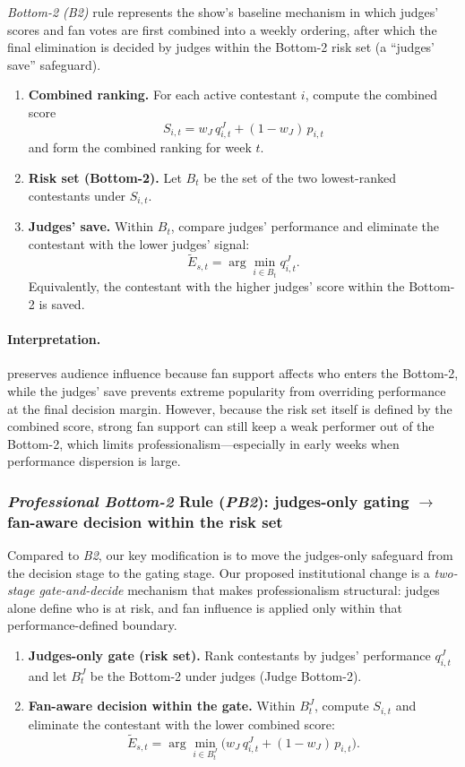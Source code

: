 \textit{Bottom-2 (B2)} rule represents the show's baseline mechanism in which judges' scores and fan votes are first combined into a weekly
ordering, after which the final elimination is decided by judges within the Bottom-2 risk set (a ``judges' save'' safeguard).

\begin{enumerate}
  \item \textbf{Combined ranking.} For each active contestant $i$, compute the combined score
  \[S_{i,t}=w_J\,q^J_{i,t} + (1-w_J)\,p_{i,t}\] and form the combined ranking for week $t$.
  \item \textbf{Risk set (Bottom-2).} Let $B_t$ be the set of the two lowest-ranked contestants under $S_{i,t}$.
  \item \textbf{Judges' save.} Within $B_t$, compare judges' performance and eliminate the contestant with the lower judges' signal:
  \[
  \tilde{E}_{s,t}=\arg\min_{i\in B_t} q^J_{i,t}.
  \]
  Equivalently, the contestant with the higher judges' score within the Bottom-2 is saved.
\end{enumerate}

\paragraph{Interpretation.}
 preserves audience influence because fan support affects who enters the Bottom-2,
while the judges' save prevents extreme popularity from overriding performance at the final decision margin.
However, because the risk set itself is defined by the combined score, strong fan support can still keep a weak performer
out of the Bottom-2, which limits professionalism---especially in early weeks when performance dispersion is large.


\subsubsection{\textit{Professional Bottom-2} Rule (\textit{PB2}): judges-only gating $\rightarrow$ fan-aware decision within the risk set}
\label{subsubsec:d2_ruleB}

Compared to \textit{B2}, our key modification is to move the judges-only safeguard from the decision stage to the gating stage.
Our proposed institutional change is a \emph{two-stage gate-and-decide} mechanism that makes professionalism structural:
judges alone define who is at risk, and fan influence is applied only within that performance-defined boundary.

\begin{enumerate}
  \item \textbf{Judges-only gate (risk set).} Rank contestants by judges' performance $q^J_{i,t}$ and let
  $B^J_t$ be the Bottom-2 under judges (Judge Bottom-2).
  \item \textbf{Fan-aware decision within the gate.} Within $B^J_t$, compute $S_{i,t}$ and eliminate the contestant with the lower combined score:
  \[
  \tilde{E}_{s,t}=\arg\min_{i\in B^J_t} \big(w_J\,q^J_{i,t} + (1-w_J)\,p_{i,t}\big).
  \]
\end{enumerate}

